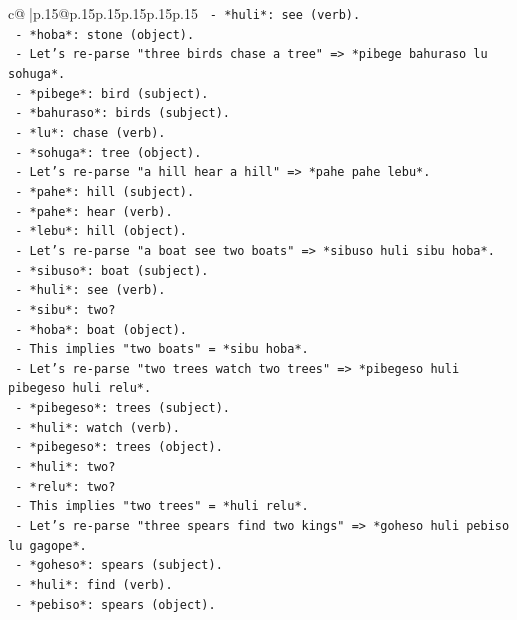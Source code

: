 \documentclass{article}
\begin{document}
{\begin{supertabular}{c@{$\;$}|p{.15\linewidth}@{}p{.15\linewidth}p{.15\linewidth}p{.15\linewidth}p{.15\linewidth}p{.15\linewidth}}
{{{\texttt{      {-} *huli*: see (verb).} \\
\texttt{      {-} *hoba*: stone (object).} \\
\texttt{    {-} Let's re{-}parse "three birds chase a tree" => *pibege bahuraso lu sohuga*.} \\
\texttt{      {-} *pibege*: bird (subject).} \\
\texttt{      {-} *bahuraso*: birds (subject).} \\
\texttt{      {-} *lu*: chase (verb).} \\
\texttt{      {-} *sohuga*: tree (object).} \\
\texttt{    {-} Let's re{-}parse "a hill hear a hill" => *pahe pahe lebu*.} \\
\texttt{      {-} *pahe*: hill (subject).} \\
\texttt{      {-} *pahe*: hear (verb).} \\
\texttt{      {-} *lebu*: hill (object).} \\
\texttt{    {-} Let's re{-}parse "a boat see two boats" => *sibuso huli sibu hoba*.} \\
\texttt{      {-} *sibuso*: boat (subject).} \\
\texttt{      {-} *huli*: see (verb).} \\
\texttt{      {-} *sibu*: two?} \\
\texttt{      {-} *hoba*: boat (object).} \\
\texttt{      {-} This implies "two boats" = *sibu hoba*.} \\
\texttt{    {-} Let's re{-}parse "two trees watch two trees" => *pibegeso huli pibegeso huli relu*.} \\
\texttt{      {-} *pibegeso*: trees (subject).} \\
\texttt{      {-} *huli*: watch (verb).} \\
\texttt{      {-} *pibegeso*: trees (object).} \\
\texttt{      {-} *huli*: two?} \\
\texttt{      {-} *relu*: two?} \\
\texttt{      {-} This implies "two trees" = *huli relu*.} \\
\texttt{    {-} Let's re{-}parse "three spears find two kings" => *goheso huli pebiso lu gagope*.} \\
\texttt{      {-} *goheso*: spears (subject).} \\
\texttt{      {-} *huli*: find (verb).} \\
\texttt{      {-} *pebiso*: spears (object).} \\
}}}
\end{supertabular}}
\end{document}
